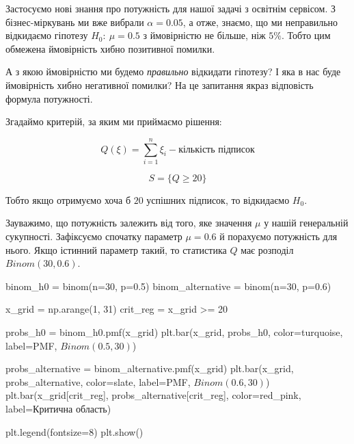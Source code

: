 \documentclass[
  letterpaper,
  10pt,
  openany]{report}
\newenvironment{Shaded}{\begin{snugshade}}{\end{snugshade}}
\newcommand{\DecValTok}[1]{\textcolor[rgb]{0.68,0.00,0.00}{#1}}
\newcommand{\FloatTok}[1]{\textcolor[rgb]{0.68,0.00,0.00}{#1}}
\newcommand{\NormalTok}[1]{\textcolor[rgb]{0.00,0.23,0.31}{#1}}
\newcommand{\OperatorTok}[1]{\textcolor[rgb]{0.37,0.37,0.37}{#1}}
\newcommand{\StringTok}[1]{\textcolor[rgb]{0.13,0.47,0.30}{#1}}
\theoremstyle{definition}
\theoremstyle{remark}
\begin{document}
Застосуємо нові знання про потужність для нашої задачі з освітнім
сервісом. З бізнес-міркувань ми вже вибрали \(\alpha = 0.05\), а отже,
знаємо, що ми неправильно відкидаємо гіпотезу \(H_0:\ \mu = 0.5\) з
ймовірністю не більше, ніж \(5\%\). Тобто цим обмежена ймовірність хибно
позитивної помилки.

А з якою ймовірністю ми будемо \emph{правильно} відкидати гіпотезу? І
яка в нас буде ймовірність хибно негативної помилки? На це запитання
якраз відповість формула потужності.

Згадаймо критерій, за яким ми приймаємо рішення:

\[
Q(\xi) = \sum\limits_{i=1}^n \xi_i - \text{кількість підписок}
\]

\[
S = \{Q \geqslant 20\}
\]

Тобто якщо отримуємо хоча б \(20\) успішних підписок, то відкидаємо
\({H}_0\).

Зауважимо, що потужність залежить від того, яке значення \(\mu\) у нашій
генеральній сукупності. Зафіксуємо спочатку параметр \(\mu = 0.6\) й
порахуємо потужність для нього. Якщо істинний параметр такий, то
статистика \(Q\) має розподіл \(Binom(30, 0.6)\).

\begin{Shaded}
\begin{Highlighting}[]
\NormalTok{binom\_h0 }\OperatorTok{=}\NormalTok{ binom(n}\OperatorTok{=}\DecValTok{30}\NormalTok{, p}\OperatorTok{=}\FloatTok{0.5}\NormalTok{)}
\NormalTok{binom\_alternative }\OperatorTok{=}\NormalTok{ binom(n}\OperatorTok{=}\DecValTok{30}\NormalTok{, p}\OperatorTok{=}\FloatTok{0.6}\NormalTok{)}

\NormalTok{x\_grid }\OperatorTok{=}\NormalTok{ np.arange(}\DecValTok{1}\NormalTok{, }\DecValTok{31}\NormalTok{)}
\NormalTok{crit\_reg }\OperatorTok{=}\NormalTok{ x\_grid }\OperatorTok{\textgreater{}=} \DecValTok{20}

\NormalTok{probs\_h0 }\OperatorTok{=}\NormalTok{ binom\_h0.pmf(x\_grid)}
\NormalTok{plt.bar(x\_grid, probs\_h0, color}\OperatorTok{=}\NormalTok{turquoise, label}\OperatorTok{=}\StringTok{\textquotesingle{}PMF, $Binom(0.5, 30)$\textquotesingle{}}\NormalTok{)}

\NormalTok{probs\_alternative }\OperatorTok{=}\NormalTok{ binom\_alternative.pmf(x\_grid)}
\NormalTok{plt.bar(x\_grid, probs\_alternative, color}\OperatorTok{=}\NormalTok{slate, label}\OperatorTok{=}\StringTok{\textquotesingle{}PMF, $Binom(0.6, 30)$\textquotesingle{}}\NormalTok{)}
\NormalTok{plt.bar(x\_grid[crit\_reg], probs\_alternative[crit\_reg], color}\OperatorTok{=}\NormalTok{red\_pink, label}\OperatorTok{=}\StringTok{\textquotesingle{}Критична область\textquotesingle{}}\NormalTok{)}

\NormalTok{plt.legend(fontsize}\OperatorTok{=}\DecValTok{8}\NormalTok{)}
\NormalTok{plt.show()}
\end{Highlighting}
\end{Shaded}
\end{document}
